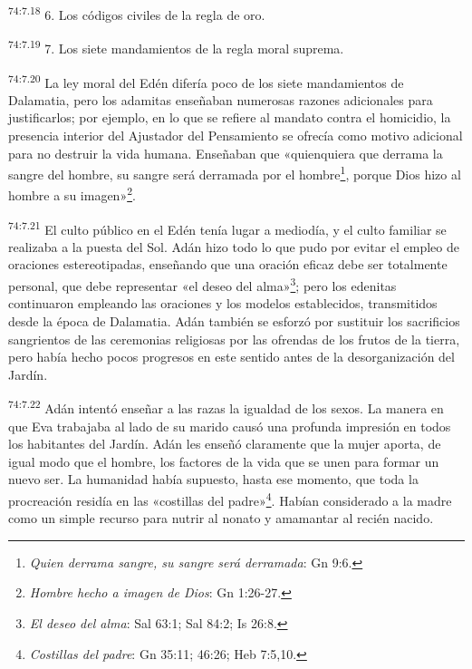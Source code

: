 \par
\textsuperscript{74:7.18} 6. Los códigos civiles de la regla de oro.

\par
\textsuperscript{74:7.19} 7. Los siete mandamientos de la regla moral suprema.

\par
\textsuperscript{74:7.20} La ley moral del Edén difería poco de los siete mandamientos de Dalamatia, pero los adamitas enseñaban numerosas razones adicionales para justificarlos; por ejemplo, en lo que se refiere al mandato contra el homicidio, la presencia interior del Ajustador del Pensamiento se ofrecía como motivo adicional para no destruir la vida humana. Enseñaban que «quienquiera que derrama la sangre del hombre, su sangre será derramada por el hombre\footnote{\textit{Quien derrama sangre, su sangre será derramada}: Gn 9:6.}, porque Dios hizo al hombre a su imagen»\footnote{\textit{Hombre hecho a imagen de Dios}: Gn 1:26-27.}.

\par
\textsuperscript{74:7.21} El culto público en el Edén tenía lugar a mediodía, y el culto familiar se realizaba a la puesta del Sol. Adán hizo todo lo que pudo por evitar el empleo de oraciones estereotipadas, enseñando que una oración eficaz debe ser totalmente personal, que debe representar «el deseo del alma»\footnote{\textit{El deseo del alma}: Sal 63:1; Sal 84:2; Is 26:8.}; pero los edenitas continuaron empleando las oraciones y los modelos establecidos, transmitidos desde la época de Dalamatia. Adán también se esforzó por sustituir los sacrificios sangrientos de las ceremonias religiosas por las ofrendas de los frutos de la tierra, pero había hecho pocos progresos en este sentido antes de la desorganización del Jardín.

\par
\textsuperscript{74:7.22} Adán intentó enseñar a las razas la igualdad de los sexos. La manera en que Eva trabajaba al lado de su marido causó una profunda impresión en todos los habitantes del Jardín. Adán les enseñó claramente que la mujer aporta, de igual modo que el hombre, los factores de la vida que se unen para formar un nuevo ser. La humanidad había supuesto, hasta ese momento, que toda la procreación residía en las «costillas del padre»\footnote{\textit{Costillas del padre}: Gn 35:11; 46:26; Heb 7:5,10.}. Habían considerado a la madre como un simple recurso para nutrir al nonato y amamantar al recién nacido.

